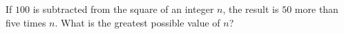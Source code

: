 If $100$ is subtracted from the square of an integer $n$, the result is $50$ more than five times $n$. What is the greatest possible value of $n$?
